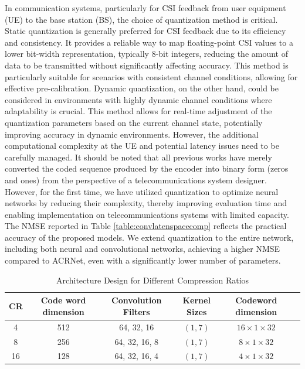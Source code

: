 \documentclass[lettersize,journal]{IEEEtran}
\begin{document}
In communication systems, particularly for CSI feedback from user equipment (UE) to the base station (BS), the choice of quantization method is critical. Static quantization is generally preferred for CSI feedback due to its efficiency and consistency. It provides a reliable way to map floating-point CSI values to a lower bit-width representation, typically 8-bit integers, reducing the amount of data to be transmitted without significantly affecting accuracy. This method is particularly suitable for scenarios with consistent channel conditions, allowing for effective pre-calibration.
Dynamic quantization, on the other hand, could be considered in environments with highly dynamic channel conditions where adaptability is crucial. This method allows for real-time adjustment of the quantization parameters based on the current channel state, potentially improving accuracy in dynamic environments. However, the additional computational complexity at the UE and potential latency issues need to be carefully managed.
It should be noted that all previous works have merely converted the coded sequence produced by the encoder into binary form (zeros and ones) from the perspective of a telecommunications system designer. However, for the first time, we have utilized quantization to optimize neural networks by reducing their complexity, thereby improving evaluation time and enabling implementation on telecommunications systems with limited capacity.
The NMSE reported in Table \ref{table:convlatenspacecomp} reflects the practical accuracy of the proposed models. We extend quantization to the entire network, including both neural and convolutional networks, achieving a higher NMSE compared to ACRNet, even with a significantly lower number of parameters.



\begin{table}[ht]
	\caption{Architecture Design for Different Compression Ratios}
	\label{table:model_comparison}
	\centering
	\begin{tabular}{cccccc}
		\toprule
		\textbf{CR} & \textbf{Code word dimension} & \textbf{Convolution Filters} & \textbf{Kernel Sizes} & \textbf{Codeword dimension} \\
		\midrule
		4 & 512 & 64, 32, 16 & $(1,7)$ & $16 \times 1 \times 32$ \\
		8 & 256 & 64, 32, 16, 8 & $(1,7)$ & $8 \times 1 \times 32$ \\
		16 & 128 & 64, 32, 16, 4 & $(1,7)$ & $4 \times 1 \times 32$ \\
		\bottomrule
	\end{tabular}
\end{table}
\end{document}

